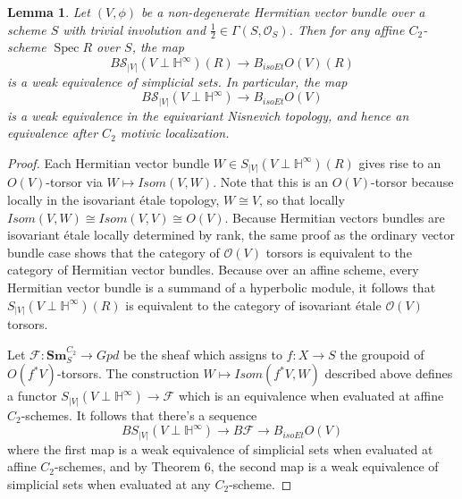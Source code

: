 \documentclass[edeposit,fullpage]{uiucthesis2009}
\newcommand{\Z}{\mathbb Z}
\newcommand{\mbb}{\mathbb}
\newcommand{\mc}{\mathcal}
\newcommand{\Sm}[1]{\mathbf{Sm}_{#1}}
\DeclareMathOperator{\Spec}{Spec}
\theoremstyle{plain}
\newtheorem{lemma}{Lemma}
\numberwithin{lemma}{section}
\theoremstyle{definition}
\begin{document}
\begin{lemma} \label{lem:weqaff}
Let $(V,\phi)$ be a non-degenerate Hermitian vector bundle over a
scheme $S$ with trivial involution and $\frac{1}{2} \in \Gamma(S,\mc
O_S)$. Then for any affine $C_2$-scheme $\Spec R$ over $S$, the map
\[
B\mc S_{|V|}(V\perp \mbb H^\infty)(R) \rightarrow B_{isoEt}O(V)(R)
\]
is a weak equivalence of simplicial sets. In particular, the map
\[
B\mc S_{|V|}(V\perp \mbb H^\infty) \rightarrow B_{isoEt}O(V)
\]
is a weak equivalence in the equivariant Nisnevich topology, and hence an
equivalence after $C_2$ motivic localization. 
\end{lemma}

\begin{proof}




Each Hermitian vector bundle $W  \in S_{|V|}(V\perp \mbb H^\infty)(R)$
gives rise to an $ O(V)$-torsor via $W \mapsto Isom(V,W)$. Note
that this is an $O(V)$-torsor because locally in the isovariant
\'etale topology, $W \cong V$,
so that locally $Isom(V,W) \cong Isom(V,V) \cong 
O(V)$. Because Hermitian vectors bundles are isovariant \'etale locally
determined by rank, the same proof as the ordinary vector bundle case shows
that the category of $\mc O(V)$ torsors is equivalent to the category
of Hermitian vector bundles. Because over an affine scheme, every
Hermitian vector bundle is a summand of a hyperbolic module, it
follows that $S_{|V|}(V\perp \mbb H^\infty)(R)$ is equivalent to the
category of isovariant \'etale $\mc O(V)$ torsors. 

Let $\mc F : \Sm{S}^{C_2} \rightarrow Gpd$ be the sheaf which assigns
to $f : X \rightarrow S$ the groupoid of $ O(f^*V)$-torsors. The
construction $W \mapsto Isom(f^*V,W)$ described above defines a
functor $S_{|V|}(V\perp \mbb H^\infty) \rightarrow \mc F$ which is an
equivalence when evaluated at affine $C_2$-schemes. It follows that
there's a sequence
\[
B S_{|V|}(V\perp \mbb H^\infty) \rightarrow B\mc F \rightarrow B_{isoEt}O(V)
\]
where the first map is a weak equivalence of simplicial sets when
evaluated at affine $C_2$-schemes, and by \cite{Jar01} Theorem 6, the second map is a
weak equivalence of simplicial sets when evaluated at any
$C_2$-scheme. 
\end{proof}
\end{document}
